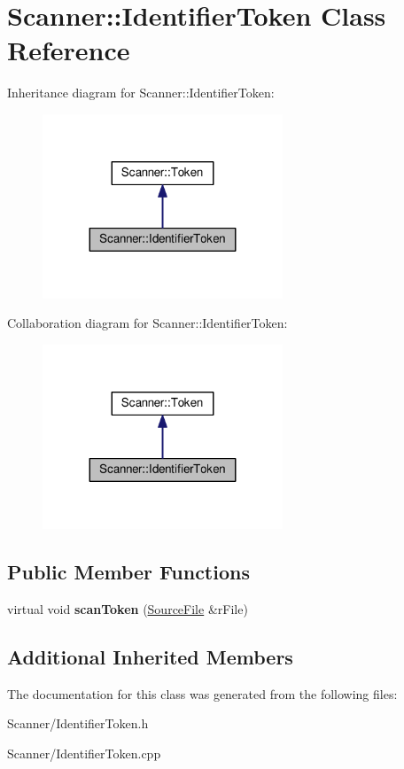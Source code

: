 \hypertarget{class_scanner_1_1_identifier_token}{}\section{Scanner\+:\+:Identifier\+Token Class Reference}
\label{class_scanner_1_1_identifier_token}


Inheritance diagram for Scanner\+:\+:Identifier\+Token\+:
\nopagebreak
\begin{figure}[H]
\begin{center}
\leavevmode
\includegraphics[width=203pt]{class_scanner_1_1_identifier_token__inherit__graph}
\end{center}
\end{figure}


Collaboration diagram for Scanner\+:\+:Identifier\+Token\+:
\nopagebreak
\begin{figure}[H]
\begin{center}
\leavevmode
\includegraphics[width=203pt]{class_scanner_1_1_identifier_token__coll__graph}
\end{center}
\end{figure}
\subsection*{Public Member Functions}
\begin{DoxyCompactItemize}
\item 
virtual void {\bfseries scan\+Token} (\hyperlink{class_scanner_1_1_source_file}{Source\+File} \&r\+File)\hypertarget{class_scanner_1_1_identifier_token_a3fb2da988de14bc2f33d96e66efc18da}{}\label{class_scanner_1_1_identifier_token_a3fb2da988de14bc2f33d96e66efc18da}

\end{DoxyCompactItemize}
\subsection*{Additional Inherited Members}


The documentation for this class was generated from the following files\+:\begin{DoxyCompactItemize}
\item 
Scanner/Identifier\+Token.\+h\item 
Scanner/Identifier\+Token.\+cpp\end{DoxyCompactItemize}

